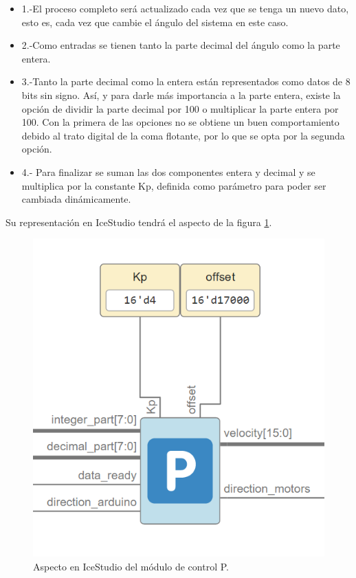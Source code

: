 \begin{itemize}
	\item 1.-El proceso completo será actualizado cada vez que se tenga un nuevo dato, esto es, cada vez que cambie el ángulo del sistema en este caso.
	\item 2.-Como entradas se tienen tanto la parte decimal del ángulo como la parte entera.
	\item 3.-Tanto la parte decimal como la entera están representados como datos de 8 bits sin signo. Así, y para darle más importancia a la parte entera, existe la opción de dividir la parte decimal por 100 o multiplicar la parte entera por 100. Con la primera de las opciones no se obtiene un buen comportamiento debido al trato digital de la coma flotante, por lo que se opta por la segunda opción.
	\item 4.- Para finalizar se suman las dos componentes entera y decimal y se multiplica por la constante Kp, definida como parámetro para poder ser cambiada dinámicamente.
\end{itemize}

Su representación en IceStudio tendrá el aspecto de la figura \ref{fig:Pcontrol}.

\begin{figure}[H]
	\center
	\includegraphics[scale=0.5]{imagenes/Balancing_robot/Pcontrol}
	\caption{Aspecto en IceStudio del módulo de control P.}
	\label{fig:Pcontrol}
\end{figure}

